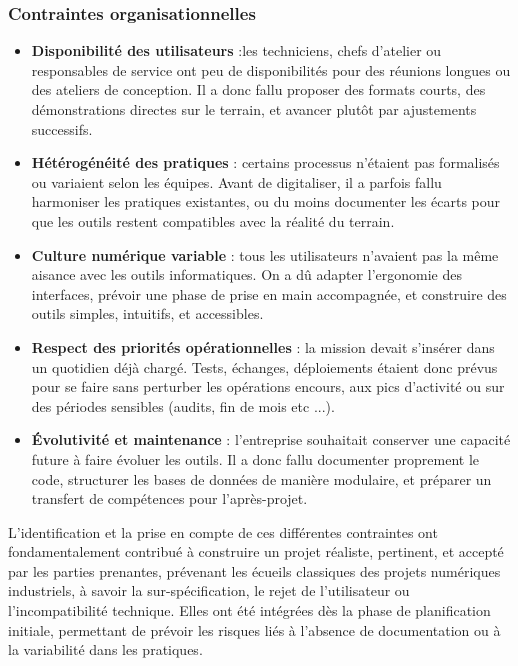 \documentclass[11pt,a4paper]{article}
\begin{document}
\newpage
\subsubsection{Contraintes organisationnelles}

\begin{itemize}
    \item \textbf{Disponibilité des utilisateurs} :les techniciens, chefs d’atelier ou responsables de service ont peu de disponibilités pour des réunions longues ou des ateliers de conception. Il a donc fallu proposer des formats courts, des démonstrations directes sur le terrain, et avancer plutôt par ajustements successifs.
    
    
    \item \textbf{Hétérogénéité des pratiques} : certains processus n’étaient pas formalisés ou variaient selon les équipes. Avant de digitaliser, il a parfois fallu harmoniser les pratiques existantes, ou du moins documenter les écarts pour que les outils restent compatibles avec la réalité du terrain.

    \item \textbf{Culture numérique variable} :  tous les utilisateurs n’avaient pas la même aisance avec les outils informatiques. On a dû adapter l’ergonomie des interfaces, prévoir une phase de prise en main accompagnée, et construire des outils simples, intuitifs, et accessibles.

    \item \textbf{Respect des priorités opérationnelles} : la mission devait s’insérer dans un quotidien déjà chargé. Tests, échanges, déploiements étaient donc prévus pour se faire sans perturber les opérations encours, aux pics d’activité ou sur des périodes sensibles (audits, fin de mois etc ...).
    
    \item \textbf{Évolutivité et maintenance} : l’entreprise souhaitait conserver une capacité future à faire évoluer les outils. Il a donc fallu documenter proprement le code, structurer les bases de données de manière modulaire, et préparer un transfert de compétences pour l’après-projet.
\end{itemize}

L’identification et la prise en compte de ces différentes contraintes ont fondamentalement contribué à construire un projet réaliste, pertinent, et accepté par les parties prenantes, prévenant les écueils classiques des projets numériques industriels, à savoir la sur-spécification, le rejet de l’utilisateur ou l’incompatibilité technique. Elles ont été intégrées dès la phase de planification initiale, permettant de prévoir les risques liés à l’absence de documentation ou à la variabilité dans les pratiques.
\end{document}
